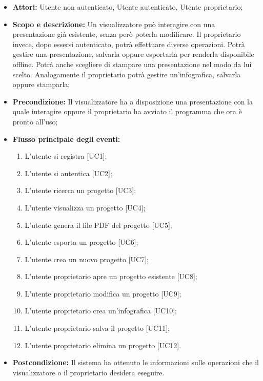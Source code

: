 \begin{itemize}
	\item \textbf{Attori:} Utente non autenticato, Utente autenticato, Utente proprietario;
	
	\item \textbf{Scopo e descrizione:} Un visualizzatore può interagire con una presentazione già esistente, senza però poterla modificare. Il proprietario invece, dopo essersi autenticato, potrà effettuare diverse operazioni. Potrà gestire una presentazione, salvarla oppure esportarla per renderla disponibile offline. Potrà anche scegliere di stampare una presentazione nel modo da lui scelto. Analogamente il proprietario potrà gestire un'infografica, salvarla oppure stamparla;
	
	\item \textbf{Precondizione:} Il visualizzatore ha a disposizione una presentazione con la quale interagire oppure il proprietario ha avviato il programma che ora è pronto all'uso;
	
	\item \textbf{Flusso principale degli eventi:}
	\begin{enumerate}
		\item L'utente si registra [UC1];
		\item L'utente si autentica [UC2];
		\item L'utente ricerca un progetto [UC3];
		\item L'utente visualizza un progetto [UC4];
		\item L'utente genera il file PDF del progetto [UC5];
		\item L'utente esporta un progetto [UC6];
		\item L'utente crea un nuovo progetto [UC7];
		\item L'utente proprietario apre un progetto esistente [UC8];
		\item L'utente proprietario modifica un progetto [UC9];
		\item L'utente proprietario crea un'infografica [UC10];
		\item L'utente proprietario salva il progetto [UC11];
		\item L'utente proprietario elimina un progetto [UC12].
	\end{enumerate}
	
	\item \textbf{Postcondizione:} Il sistema ha ottenuto le informazioni sulle operazioni che il visualizzatore o il proprietario desidera eseguire.
\end{itemize}

